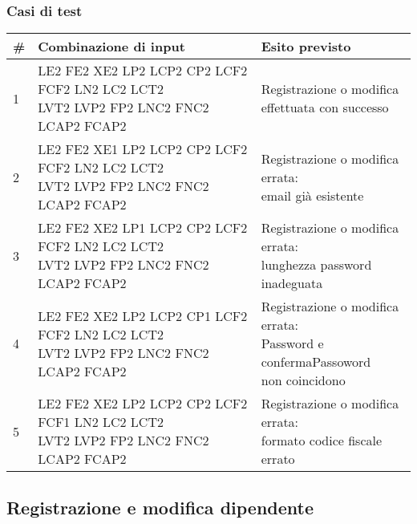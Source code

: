 \documentclass[12pt]{article}
\begin{document}
\subsubsection{Casi di test}
\begin{center}
\begin{tabular}{|l|l|l|}
\hline
\rowcolor[HTML]{C0C0C0} \textbf{\#} & \textbf{Combinazione di input} & \textbf{Esito previsto}  \\ \hline
1 & \makecell{LE2 FE2 XE2 LP2 LCP2 CP2 LCF2 FCF2 LN2 LC2 LCT2\\ LVT2 LVP2 FP2 LNC2 FNC2 LCAP2 FCAP2} & \makecell{Registrazione o modifica \\ effettuata con successo} \\ \hline
2 & \makecell{LE2 FE2 XE1 LP2 LCP2 CP2 LCF2 FCF2 LN2 LC2 LCT2\\ LVT2 LVP2 FP2 LNC2 FNC2 LCAP2 FCAP2}  & \makecell{Registrazione o modifica errata:\\ email già esistente} \\ \hline
3 & \makecell{LE2 FE2 XE2 LP1 LCP2 CP2 LCF2 FCF2 LN2 LC2 LCT2\\ LVT2 LVP2 FP2 LNC2 FNC2 LCAP2 FCAP2}  & \makecell{Registrazione o modifica errata:\\ lunghezza password inadeguata} \\ \hline
4 &\makecell{LE2 FE2 XE2 LP2 LCP2 CP1 LCF2 FCF2 LN2 LC2 LCT2\\ LVT2 LVP2 FP2 LNC2 FNC2 LCAP2 FCAP2}  & \makecell{ Registrazione o modifica errata:\\ Password e confermaPassoword \\ non coincidono} \\ \hline
5 & \makecell{LE2 FE2 XE2 LP2 LCP2 CP2 LCF2 FCF1 LN2 LC2 LCT2\\ LVT2 LVP2 FP2 LNC2 FNC2 LCAP2 FCAP2}  & \makecell{Registrazione o modifica errata:\\ formato codice fiscale errato} \\ \hline
\end{tabular}
\end{center}

\newpage

\subsection{Registrazione e modifica dipendente}
\end{document}
